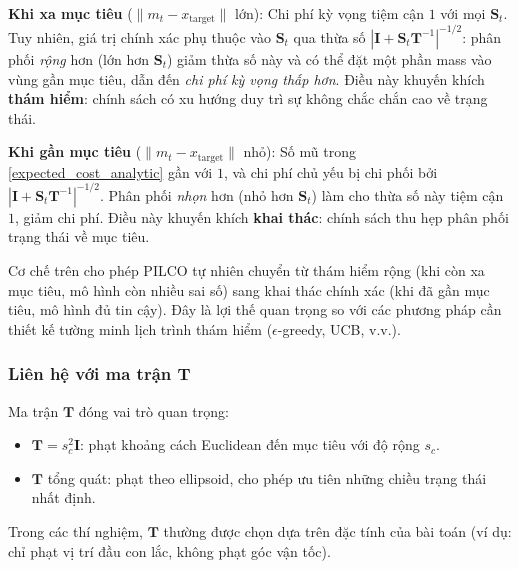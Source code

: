 \textbf{Khi xa mục tiêu} ($\|m_t - x_{\mathrm{target}}\|$ lớn): Chi phí kỳ vọng tiệm cận $1$ với mọi $\mathbf{S}_t$. Tuy nhiên, giá trị chính xác phụ thuộc vào $\mathbf{S}_t$ qua thừa số $|\mathbf{I} + \mathbf{S}_t \mathbf{T}^{-1}|^{-1/2}$: phân phối \textit{rộng} hơn (lớn hơn $\mathbf{S}_t$) giảm thừa số này và có thể đặt một phần mass vào vùng gần mục tiêu, dẫn đến \textit{chi phí kỳ vọng thấp hơn}. Điều này khuyến khích \textbf{thám hiểm}: chính sách có xu hướng duy trì sự không chắc chắn cao về trạng thái.

\textbf{Khi gần mục tiêu} ($\|m_t - x_{\mathrm{target}}\|$ nhỏ): Số mũ trong \eqref{expected_cost_analytic} gần với $1$, và chi phí chủ yếu bị chi phối bởi $|\mathbf{I} + \mathbf{S}_t \mathbf{T}^{-1}|^{-1/2}$. Phân phối \textit{nhọn} hơn (nhỏ hơn $\mathbf{S}_t$) làm cho thừa số này tiệm cận $1$, giảm chi phí. Điều này khuyến khích \textbf{khai thác}: chính sách thu hẹp phân phối trạng thái về mục tiêu.

\begin{nx}
    Cơ chế trên cho phép PILCO tự nhiên chuyển từ thám hiểm rộng (khi còn xa mục tiêu, mô hình còn nhiều sai số) sang khai thác chính xác (khi đã gần mục tiêu, mô hình đủ tin cậy). Đây là lợi thế quan trọng so với các phương pháp cần thiết kế tường minh lịch trình thám hiểm ($\epsilon$-greedy, UCB, v.v.).
\end{nx}

\subsubsection{Liên hệ với ma trận $\mathbf{T}$}
\label{SUB_SUB_SEC_T_matrix}

Ma trận $\mathbf{T}$ đóng vai trò quan trọng:
\begin{itemize}
    \item $\mathbf{T} = s_c^2 \mathbf{I}$: phạt khoảng cách Euclidean đến mục tiêu với độ rộng $s_c$.
    \item $\mathbf{T}$ tổng quát: phạt theo ellipsoid, cho phép ưu tiên những chiều trạng thái nhất định.
\end{itemize}
Trong các thí nghiệm, $\mathbf{T}$ thường được chọn dựa trên đặc tính của bài toán (ví dụ: chỉ phạt vị trí đầu con lắc, không phạt góc vận tốc).
\medskip
